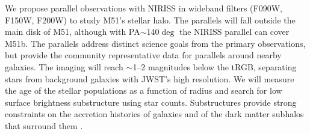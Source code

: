 \documentclass[12pt]{article}
\begin{document}
%
%
\coordinatedobs %
\vspace{-0.15in}
We propose parallel observations with NIRISS in wideband filters 
(F090W, F150W, F200W) 
to study M51's stellar halo. The parallels will fall outside the main disk of M51, although with PA$\sim$140$\deg$ the NIRISS parallel can cover M51b. The parallels address distinct science goals from the primary observations, but provide the community representative data for parallels around nearby galaxies. The imaging will reach $\sim$1--2 magnitudes below the tRGB, separating stars from background galaxies with JWST's high resolution. We will measure the age of the stellar populations as a function of radius and search for low surface brightness substructure using star counts. Substructures provide strong constraints on the accretion histories of galaxies \citep{bullock2005,pillepich2014} and of the dark matter subhalos that surround them \citep{johnston1999}.



%
%
\duplications           %


%
%
\analysisplan %
\end{document}
